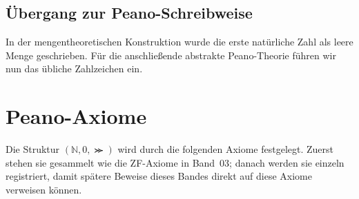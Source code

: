 \documentclass[main.tex]{subfiles}
\begin{document}
\section{Übergang zur Peano-Schreibweise}

In der mengentheoretischen Konstruktion wurde die erste natürliche Zahl als
leere Menge geschrieben. Für die anschließende abstrakte Peano-Theorie führen
wir nun das übliche Zahlzeichen ein.

\FormulaDefAuto[Nullzeichen]{0\coloneqq\varnothing}

\chapter{Peano-Axiome}

Die Struktur \((\mathbb{N},0,\Succ)\) wird durch die folgenden Axiome
festgelegt. Zuerst stehen sie gesammelt wie die ZF-Axiome in Band~03; danach
werden sie einzeln registriert, damit spätere Beweise dieses Bandes direkt
auf diese Axiome verweisen können.
\end{document}
